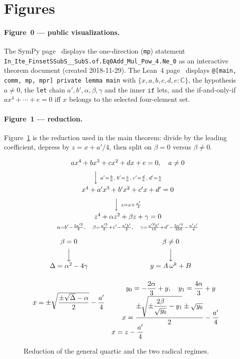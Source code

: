\documentclass[11pt,a4paper]{article}
\newcommand{\C}{\mathbb{C}}
\begin{document}
\section{Figures}
\label{sec:figures}

\paragraph{Figure~0 --- public visualizations.}
The SymPy page~\cite{lemma_quartic_sympy} displays the one-direction (\texttt{mp}) statement
\texttt{In\_Ite\_FinsetSSubS\_\_SubS.of.Eq0Add\_Mul\_Pow\_4.Ne\_0}
as an interactive theorem document (created 2018-11-29).
The Lean~4 page~\cite{lemma_quartic_lean} displays \texttt{@[main, comm, mp, mpr] private lemma main} with \(\{x,a,b,c,d,e:\C\}\), the hypothesis \(a\neq 0\), the \texttt{let} chain \(a',b',\alpha,\beta,\gamma\) and the inner \(\mathtt{if}\) lets, and the if-and-only-if
\(ax^4+\cdots+e=0\) iff \(x\) belongs to the selected four-element set.

\paragraph{Figure~1 --- reduction.}
Figure~\ref{fig:reduction} is the reduction used in the main theorem: divide by the leading coefficient, depress by \(z=x+a'/4\), then split on \(\beta=0\) versus \(\beta\neq 0\).

\begin{figure}[ht]
\centering
\footnotesize
\[
\begin{array}{c}
a x^{4}+b x^{3}+c x^{2}+d x+e=0,\quad a\neq 0 \\[0.6em]
\Big\downarrow\ \scriptstyle a'=\frac{b}{a},\; b'=\frac{c}{a},\; c'=\frac{d}{a},\; d'=\frac{e}{a} \\[0.6em]
x^{4}+a' x^{3}+b' x^{2}+c' x+d'=0 \\[0.6em]
\Big\downarrow\ \scriptstyle z=x+\frac{a'}{4} \\[0.6em]
z^{4}+\alpha z^{2}+\beta z+\gamma=0 \\[0.25em]
\scriptstyle
\alpha=b'-\frac{3a'^{2}}{8},\quad
\beta=\frac{a'^{3}}{8}+c'-\frac{a'b'}{2},\quad
\gamma=\frac{a'^{2}b'}{16}+d'-\frac{3a'^{4}}{256}-\frac{a'c'}{4}
\\[1.0em]
\begin{array}{c@{\qquad}c}
\beta=0 & \beta\neq 0 \\[0.4em]
\Big\downarrow & \Big\downarrow \\[0.4em]
\Delta=\alpha^{2}-4\gamma &
y=A\,\omega^{k}+B
\\[1.6em]
x=\pm\sqrt{\dfrac{\pm\sqrt{\Delta}-\alpha}{2}}-\dfrac{a'}{4}
&
\begin{array}{c}
y_{0}=-\dfrac{2\alpha}{3}+y,\quad y_{1}=\dfrac{4\alpha}{3}+y \\[0.45em]
x=\dfrac{\pm\sqrt{\pm\dfrac{2\beta}{\sqrt{y_{0}}}-y_{1}}\pm\sqrt{y_{0}}}{2}-\dfrac{a'}{4}
\end{array}
\end{array}
\\[1.0em]
x=z-\dfrac{a'}{4}
\end{array}
\]
\caption{Reduction of the general quartic and the two radical regimes.}
\label{fig:reduction}
\end{figure}
\end{document}
